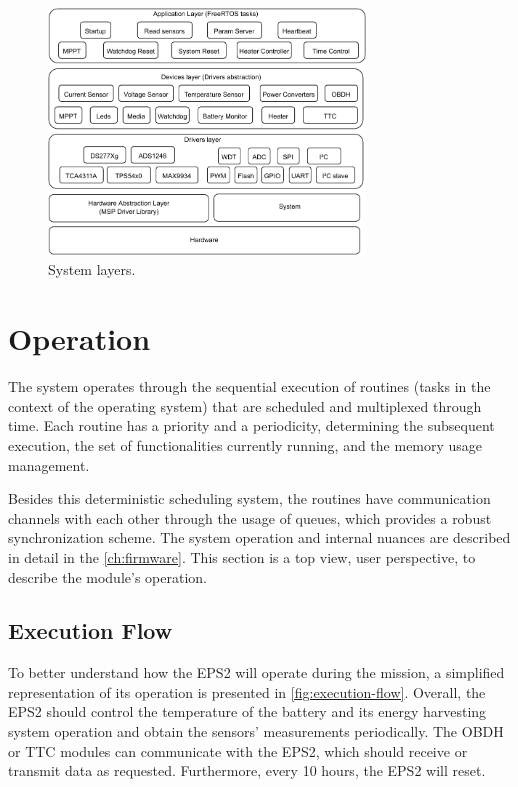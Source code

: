 \begin{figure}[!ht]
    \begin{center}
        \includegraphics[width=0.75\textwidth]{figures/eps-system-layers.pdf}
        \caption{System layers.}
        \label{fig:system-layers}
    \end{center}
\end{figure}

\section{Operation} \label{sec:operation}

The system operates through the sequential execution of routines (tasks in the context of the operating system) that are scheduled and multiplexed through time. Each routine has a priority and a periodicity, determining the subsequent execution, the set of functionalities currently running, and the memory usage management.

Besides this deterministic scheduling system, the routines have communication channels with each other through the usage of queues, which provides a robust synchronization scheme. The system operation and internal nuances are described in detail in the \autoref{ch:firmware}. This section is a top view, user perspective, to describe the module's operation.

\subsection{Execution Flow}

To better understand how the EPS2 will operate during the mission, a simplified representation of its operation is presented in \autoref{fig:execution-flow}. Overall, the EPS2 should control the temperature of the battery and its energy harvesting system operation and obtain the sensors' measurements periodically. The OBDH or TTC modules can communicate with the EPS2, which should receive or transmit data as requested. Furthermore, every 10 hours, the EPS2 will reset.

